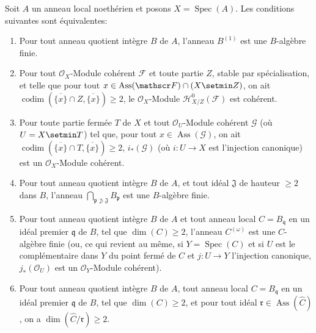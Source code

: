 \begin{proposition}[7.2.4]
\label{IV.2.s7.2.4-fr}
Soit $A$ un anneau local noethérien et posons
$X=\operatorname{Spec}(A)$. Les conditions suivantes sont équivalentes:
\begin{enumerate}
\item[\textup{a)}] Pour tout anneau quotient intègre $B$ de $A$, l'anneau $B^{(1)}$
est une $B$-algèbre finie.
\item[\textup{b)}] Pour tout $\mathscr O_X$-Module cohérent $\mathscr F$ et toute
partie $Z$, stable par spécialisation, et telle que pour tout
$x\in\operatorname{Ass}(\mathscr F)\cap(X\setmin Z)$, on ait
$\operatorname{codim}(\overline{\{x\}}\cap Z,\overline{\{x\}})\geqslant2$,
le $\mathscr O_X$-Module $\mathscr H^0_{X/Z}(\mathscr F)$ est cohérent.
\item[\textup{c)}] Pour toute partie fermée $T$ de $X$ et tout
$\mathscr O_U$-Module cohérent $\mathscr G$ (où $U=X\setmin T$) tel que, pour tout
$x\in\operatorname{Ass}(\mathscr G)$, on ait
$\operatorname{codim}(\overline{\{x\}}\cap T,\overline{\{x\}})\geqslant2$,
$i_*(\mathscr G)$ (où $i:U\to X$ est l'injection canonique) est un
$\mathscr O_X$-Module cohérent.
\item[\textup{d)}] Pour tout anneau quotient intègre $B$ de $A$, et tout idéal
$\mathfrak J$ de hauteur $\geqslant2$ dans $B$, l'anneau
$\displaystyle\bigcap_{\mathfrak p\not\supset\mathfrak J}B_{\mathfrak p}$
est une $B$-algèbre finie.
\item[\textup{e)}] Pour tout anneau quotient intègre $B$ de $A$ et tout anneau local
$C=B_{\mathfrak q}$ en un idéal premier $\mathfrak q$ de $B$, tel que
$\dim(C)\geqslant2$, l'anneau $C^{(\omega)}$ est une $C$-algèbre finie \textup{(ou,
ce qui revient au même,} si $Y=\operatorname{Spec}(C)$ et si $U$ est le
complémentaire dans $Y$ du point fermé de $C$ et $j:U\to Y$ l'injection
canonique, $j_*(\mathscr O_U)$ est un $\mathscr O_Y$-Module cohérent).
\item[\textup{f)}] Pour tout anneau quotient intègre $B$ de $A$, tout anneau local
$C=B_{\mathfrak q}$ en un idéal premier $\mathfrak q$ de $B$, tel que
$\dim(C)\geqslant2$, et pour tout idéal
$\mathfrak r\in\operatorname{Ass}(\widehat C)$, on a
$\dim(\widehat C/\mathfrak r)\geqslant2$.
\end{enumerate}
\end{proposition}


